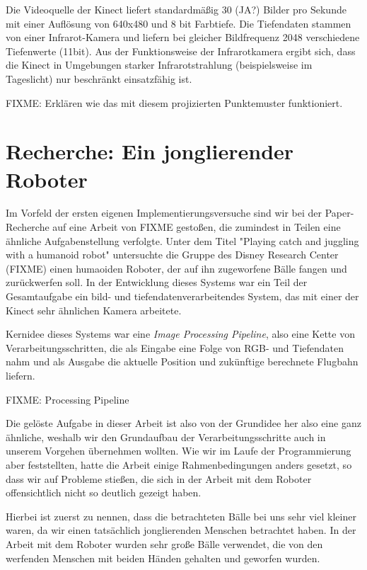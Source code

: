 \documentclass[12pt,a4paper,ngerman]{scrartcl}
\begin{document}
Die Videoquelle der Kinect liefert standardmäßig 30 (JA?) Bilder pro Sekunde mit einer
Auflösung von 640x480 und 8 bit Farbtiefe. Die Tiefendaten stammen von einer 
Infrarot-Kamera und liefern bei gleicher Bildfrequenz 2048 verschiedene 
Tiefenwerte (11bit). Aus der Funktionsweise der Infrarotkamera ergibt sich, dass
die Kinect in Umgebungen starker Infrarotstrahlung (beispielsweise im Tageslicht)
nur beschränkt einsatzfähig ist. 

FIXME: Erklären wie das mit diesem projizierten Punktemuster funktioniert. 

\section{Recherche: Ein jonglierender Roboter} 

Im Vorfeld der ersten eigenen Implementierungsversuche sind wir bei der 
Paper-Recherche auf eine Arbeit von FIXME gestoßen, die zumindest in Teilen
eine ähnliche Aufgabenstellung verfolgte. Unter dem Titel "Playing catch and juggling 
with a humanoid robot" untersuchte die Gruppe des Disney Research Center (FIXME)
einen humaoiden Roboter, der auf ihn zugeworfene Bälle fangen und zurückwerfen soll.
In der Entwicklung dieses Systems war ein Teil der Gesamtaufgabe ein 
bild- und tiefendatenverarbeitendes System, das mit einer der Kinect sehr ähnlichen
Kamera arbeitete.

Kernidee dieses Systems war eine \textit{Image Processing Pipeline}, also eine
Kette von Verarbeitungsschritten, die als Eingabe eine Folge von RGB- und Tiefendaten
nahm und als Ausgabe die aktuelle Position und zukünftige berechnete Flugbahn 
liefern. 

FIXME: Processing Pipeline

Die gelöste Aufgabe in dieser Arbeit ist also von der Grundidee her also eine ganz
ähnliche, weshalb wir den Grundaufbau der Verarbeitungsschritte auch in unserem 
Vorgehen übernehmen wollten. Wie wir im Laufe der Programmierung aber feststellten,
hatte die Arbeit einige Rahmenbedingungen anders gesetzt, so dass wir auf Probleme 
stießen, die sich in der Arbeit mit dem Roboter offensichtlich nicht so deutlich
gezeigt haben.

Hierbei ist zuerst zu nennen, dass die betrachteten Bälle bei uns sehr viel kleiner
waren, da wir einen tatsächlich jonglierenden Menschen betrachtet haben. In der
Arbeit mit dem Roboter wurden sehr große Bälle verwendet, die von den werfenden
Menschen mit beiden Händen gehalten und geworfen wurden.
\end{document}

